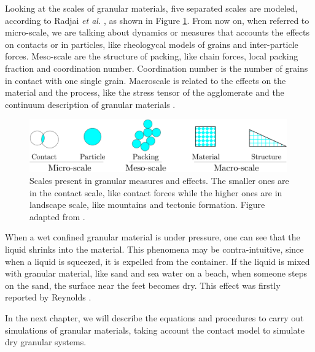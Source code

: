     Looking at the scales of granular materials, five separated scales are modeled, according to Radjai \textit{et al.} \cite{Modeling_Granular_Materials}, as shown in Figure \ref{fig:granular_scales}. From now on, when referred to micro-scale, we are talking about dynamics or measures that accounts the effects on contacts or in particles, like rheologycal models of grains and inter-particle forces. Meso-scale are the structure of packing, like chain forces, local packing fraction and coordination number. Coordination number is the number of grains in contact with one single grain. Macroscale is related to the effects on the material and the process, like the stress tensor of the agglomerate and the continuum description of granular materials \cite{Modeling_Granular_Materials}.

\begin{figure}[H]
    \centering
    \includegraphics[width=0.99\textwidth]{04-figuras/Granular_Scales.png}
    \caption[Granular scales.]{Scales present in granular measures and effects. The smaller ones are in the contact scale, like contact forces while the higher ones are in landscape scale, like mountains and tectonic formation. Figure adapted from \cite{Modeling_Granular_Materials}.}
    \label{fig:granular_scales}
\end{figure}

    When a wet confined granular material is under pressure, one can see that the liquid shrinks into the material. This phenomena may be contra-intuitive, since when a liquid is squeezed, it is expelled from the container. If the liquid is mixed with granular material, like sand and sea water on a beach, when someone steps on the sand, the surface near the feet becomes dry. This effect was firstly reported by Reynolds \cite{On_the_dilatancy}.

    In the next chapter, we will describe the equations and procedures to carry out simulations of granular materials, taking account the contact model to simulate dry granular systems.
